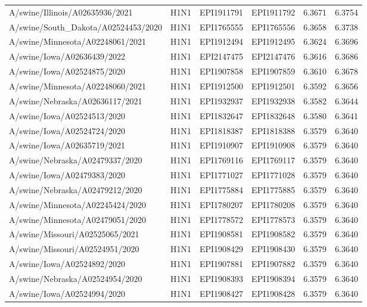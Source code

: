 \begin{tabular}{L{1.95in}|L{.25in}|L{.60in}|L{.6in}|C{1in}|C{1in}}
 A/swine/Illinois/A02635936/2021 &H1N1&EPI1911791&EPI1911792&6.3671&6.3754\\
 A/swine/South\_Dakota/A02524453/2020 &H1N1&EPI1765555&EPI1765556&6.3658&6.3738\\
 A/swine/Minnesota/A02248061/2021 &H1N1&EPI1912494&EPI1912495&6.3624&6.3696\\
 A/swine/Iowa/A02636439/2022 &H1N1&EPI2147475&EPI2147476&6.3616&6.3686\\
 A/swine/Iowa/A02524875/2020 &H1N1&EPI1907858&EPI1907859&6.3610&6.3678\\
 A/swine/Minnesota/A02248060/2021 &H1N1&EPI1912500&EPI1912501&6.3592&6.3656\\
 A/swine/Nebraska/A02636117/2021 &H1N1&EPI1932937&EPI1932938&6.3582&6.3644\\
 A/swine/Iowa/A02524513/2020 &H1N1&EPI1832647&EPI1832648&6.3580&6.3641\\
 A/swine/Iowa/A02524724/2020 &H1N1&EPI1818387&EPI1818388&6.3579&6.3640\\
 A/swine/Iowa/A02635719/2021 &H1N1&EPI1910907&EPI1910908&6.3579&6.3640\\
 A/swine/Nebraska/A02479337/2020 &H1N1&EPI1769116&EPI1769117&6.3579&6.3640\\
 A/swine/Iowa/A02479383/2020 &H1N1&EPI1771027&EPI1771028&6.3579&6.3640\\
 A/swine/Nebraska/A02479212/2020 &H1N1&EPI1775884&EPI1775885&6.3579&6.3640\\
 A/swine/Minnesota/A02245424/2020 &H1N1&EPI1780207&EPI1780208&6.3579&6.3640\\
 A/swine/Minnesota/A02479051/2020 &H1N1&EPI1778572&EPI1778573&6.3579&6.3640\\
 A/swine/Missouri/A02525065/2021 &H1N1&EPI1908581&EPI1908582&6.3579&6.3640\\
 A/swine/Missouri/A02524951/2020 &H1N1&EPI1908429&EPI1908430&6.3579&6.3640\\
 A/swine/Iowa/A02524892/2020 &H1N1&EPI1907881&EPI1907882&6.3579&6.3640\\
 A/swine/Nebraska/A02524954/2020 &H1N1&EPI1908393&EPI1908394&6.3579&6.3640\\
 A/swine/Iowa/A02524994/2020 &H1N1&EPI1908427&EPI1908428&6.3579&6.3640\\

\end{tabular}
